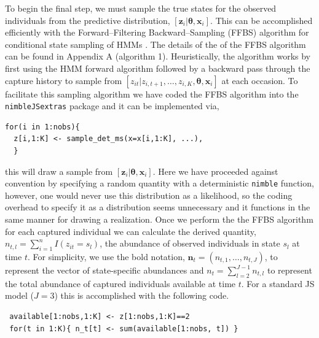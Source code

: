 \documentclass[12pt]{article}
\newcommand{\bx}{\ensuremath{\mathbf{x}}}
\newcommand{\bn}{\ensuremath{\mathbf{n}}}
\newcommand{\bz}{\ensuremath{\mathbf{z}}}
\newcommand{\bt}{\ensuremath{\boldsymbol{\theta}}}
\begin{document}
To begin the final step, we must sample the true states for the observed individuals from the predictive distribution, $[\bz_{i}| \bt, \bx_i]$. This can be accomplished efficiently with the Forward--Filtering Backward--Sampling (FFBS) algorithm for conditional state sampling of HMMs \citep{scott2002bayesian}. The details of the of the FFBS algorithm can be found in Appendix A (algorithm 1). Heuristically, the algorithm works by first using the HMM forward algorithm \citep{zucchini2016hidden} followed by a backward pass through the capture history to sample from $[z_{it}|z_{i,t+1},\dots,z_{i,K},\bt, \bx_i]$ at each occasion. To facilitate this sampling algorithm we have coded the FFBS algorithm into the {\tt nimbleJSextras} package and it can be implemented via,
\begin{verbatim}
for(i in 1:nobs){
  z[i,1:K] <- sample_det_ms(x=x[i,1:K], ...),
  }
\end{verbatim}
this will draw a sample from $[\bz_{i}| \bt, \bx_i]$. Here we have proceeded against convention by specifying a random quantity with a deterministic \verb|nimble| function, however, one would never use this distribution as a likelihood, so the coding overhead to specify it as a distribution seems unnecessary and it functions in the same manner for drawing a realization.  Once we perform the the FFBS algorithm for each captured individual we can calculate the derived quantity, $n_{t,l} = \sum_{i=1}^n I(z_{it}=s_l)$, the abundance of observed individuals in state $s_l$ at time $t$. For simplicity, we use the bold notation, $\bn_t = (n_{t,1},\dots,n_{t,J})$, to represent the vector of state-specific abundances and $n_t = \sum_{l=2}^{J-1} n_{t,l}$ to represent the total abundance of captured individuals available at time $t$. For a standard JS model ($J=3$) this is accomplished with the following code.
\begin{verbatim}
 available[1:nobs,1:K] <- z[1:nobs,1:K]==2
 for(t in 1:K){ n_t[t] <- sum(available[1:nobs, t]) }
\end{verbatim} 
\end{document}
